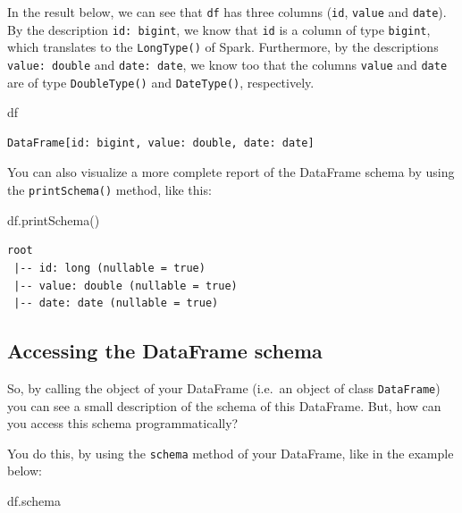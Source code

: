 \documentclass[
  11pt,
  letterpaper,
  DIV=11,
  numbers=noendperiod]{scrreprt}
\newenvironment{Shaded}{\begin{snugshade}}{\end{snugshade}}
\newcommand{\NormalTok}[1]{\textcolor[rgb]{0.00,0.23,0.31}{#1}}
\begin{document}
In the result below, we can see that \texttt{df} has three columns
(\texttt{id}, \texttt{value} and \texttt{date}). By the description
\texttt{id:\ bigint}, we know that \texttt{id} is a column of type
\texttt{bigint}, which translates to the \texttt{LongType()} of Spark.
Furthermore, by the descriptions \texttt{value:\ double} and
\texttt{date:\ date}, we know too that the columns \texttt{value} and
\texttt{date} are of type \texttt{DoubleType()} and \texttt{DateType()},
respectively.

\begin{Shaded}
\begin{Highlighting}[]
\NormalTok{df}
\end{Highlighting}
\end{Shaded}

\begin{verbatim}
DataFrame[id: bigint, value: double, date: date]
\end{verbatim}

You can also visualize a more complete report of the DataFrame schema by
using the \texttt{printSchema()} method, like this:

\begin{Shaded}
\begin{Highlighting}[]
\NormalTok{df.printSchema()}
\end{Highlighting}
\end{Shaded}

\begin{verbatim}
root
 |-- id: long (nullable = true)
 |-- value: double (nullable = true)
 |-- date: date (nullable = true)
\end{verbatim}

\hypertarget{accessing-the-dataframe-schema}{%
\subsection{Accessing the DataFrame
schema}\label{accessing-the-dataframe-schema}}

So, by calling the object of your DataFrame (i.e.~an object of class
\texttt{DataFrame}) you can see a small description of the schema of
this DataFrame. But, how can you access this schema programmatically?

You do this, by using the \texttt{schema} method of your DataFrame, like
in the example below:

\begin{Shaded}
\begin{Highlighting}[]
\NormalTok{df.schema}
\end{Highlighting}
\end{Shaded}
\end{document}
